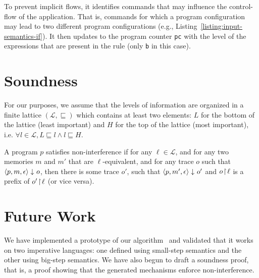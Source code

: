 \documentclass[sigplan,10pt,screen]{acmart}
\begin{document}
To prevent implicit flows, it identifies commands that may influence the control-flow of the application. That is, commands for which a program configuration may lead to two different program configurations (e.g., Listing~\ref{listing:input-semantics-if}). It then updates to the program counter \lstinline{pc} with the level of the expressions that are present in the rule (only \lstinline{b} in this case).
% 

\section{Soundness}\label{section:soundness}
For our purposes, we assume that the levels of information are organized in a finite lattice ${(\mathcal{L},\sqsubseteq)}$ which contains at least two elements: $L$ for the bottom of the lattice (least important) and $H$ for the top of the lattice (most important), i.e. $\forall l \in \mathcal{L}, L \sqsubseteq l \wedge l  \sqsubseteq H$.

\begin{definition}
	A program $p$ satisfies non-interference if for any $\ell \in \mathcal{L}$, and for any two memories $m$ and $m'$ that are $\ell$-equivalent, and for any trace $o$ such that $\langle p, m, \epsilon \rangle\downarrow_{}o $, then there is some trace $o'$, such that $\langle p, m', \epsilon \rangle\downarrow_{}o'$ and ${o \! \upharpoonright \! {\ell}}$ is a prefix of ${o' \! \upharpoonright \! {\ell}}$ (or vice versa).
\end{definition}

\newpage
\section{Future Work}
We have implemented a prototype of our algorithm~\cite{GitHub:ott-ifc} and validated that it works on two  imperative languages: one defined using small-step semantics and the other using big-step semantics. We have also begun to draft a soundness proof, that is, a proof showing that the generated mechanisms enforce non-interference.
\end{document}
